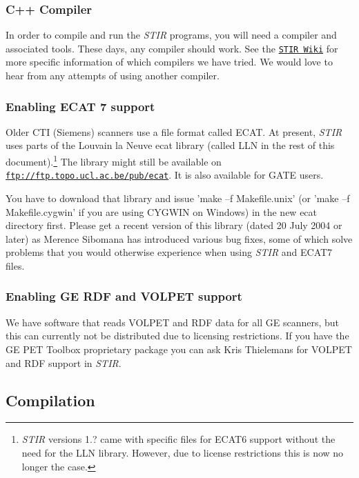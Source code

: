 \documentclass{article}
\def\R2Lurl#1#2{\mbox{\href{#1}{\tt #2}}}
\begin{document}
\subsubsection{
C++ Compiler}

In order to compile and run the \textit{STIR} programs, you will need a compiler
and associated tools. These days, any compiler should work. See the 
\R2Lurl{http://sourceforge.net/apps/mediawiki/stir}{STIR Wiki} for more
specific information of which compilers we have tried.
We would love 
to hear from any attempts of using another compiler. 

\subsubsection{
Enabling ECAT 7 support}
\label{sec:ECAT67support}
Older CTI (Siemens) scanners use a file format called ECAT\texttrademark{}.
At present, \textit{STIR} uses parts of the Louvain la Neuve ecat library (called LLN in
the rest of this document).\footnote{\textit{STIR} versions 1.? came with
specific files for ECAT6 support without the need for the LLN library. 
However, due to license restrictions this is now no longer the case.} 
The library might still be available on  
\R2Lurl{ftp://ftp.topo.ucl.ac.be/pub/ecat }{ftp://ftp.topo.ucl.ac.be/pub/ecat}.
It is also available for GATE users.

You have to download that library and issue 'make --f Makefile.unix' 
(or 'make --f Makefile.cygwin' if you are using CYGWIN on Windows) 
in the new ecat directory first. Please get a recent version 
of this library (dated 20 July 2004 or later) as Merence Sibomana 
has introduced various bug fixes, some of which solve problems 
that you would otherwise experience when using \textit{STIR} and ECAT7 
files.

\subsubsection{
Enabling GE RDF and VOLPET support}
\label{sec:RDFsupport}
We have software that reads VOLPET and RDF data for all GE scanners, but this can currently
not be distributed due to licensing restrictions. If you have the
GE PET Toolbox proprietary package you can ask Kris Thielemans for VOLPET and RDF
support in \textit{STIR}.

\subsection{
Compilation}
\end{document}
